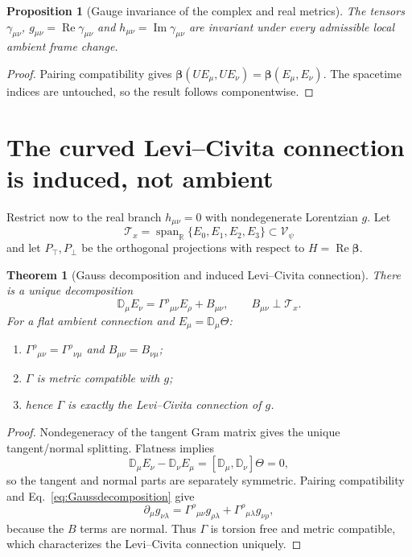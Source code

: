 \documentclass[11pt,a4paper]{article}
\newtheorem{theorem}[definition]{Theorem}
\newtheorem{proposition}[definition]{Proposition}
\theoremstyle{remark}
\newcommand{\V}{\mathscr V_\psi}
\newcommand{\Db}{\mathbb D}
\newcommand{\betaC}{\boldsymbol\beta}
\begin{document}
\begin{proposition}[Gauge invariance of the complex and real metrics]
The tensors $\gamma_{\mu\nu}$, $g_{\mu\nu}=\operatorname{Re}\gamma_{\mu\nu}$
and $h_{\mu\nu}=\operatorname{Im}\gamma_{\mu\nu}$ are invariant under every
admissible local ambient frame change.
\end{proposition}

\begin{proof}
Pairing compatibility gives
$\betaC(UE_\mu,UE_\nu)=\betaC(E_\mu,E_\nu)$.  The spacetime indices are
untouched, so the result follows componentwise.
\end{proof}

\section{The curved Levi--Civita connection is induced, not ambient}

Restrict now to the real branch $h_{\mu\nu}=0$ with nondegenerate Lorentzian
$g$.  Let
\[
 \mathscr T_x=\operatorname{span}_{\mathbb R}\{E_0,E_1,E_2,E_3\}
 \subset\V
\]
and let $P_\top,P_\perp$ be the orthogonal projections with respect to
$H=\operatorname{Re}\betaC$.

\begin{theorem}[Gauss decomposition and induced Levi--Civita connection]
There is a unique decomposition
\begin{equation}
 \boxed{
 \Db_\mu E_\nu
 =\Gamma^\rho{}_{\mu\nu}E_\rho+B_{\mu\nu},
 \qquad B_{\mu\nu}\perp\mathscr T_x.}
 \label{eq:Gaussdecomposition}
\end{equation}
For a flat ambient connection and $E_\mu=\Db_\mu\Theta$:
\begin{enumerate}
 \item $\Gamma^\rho{}_{\mu\nu}=\Gamma^\rho{}_{\nu\mu}$ and
       $B_{\mu\nu}=B_{\nu\mu}$;
 \item $\Gamma$ is metric compatible with $g$;
 \item hence $\Gamma$ is exactly the Levi--Civita connection of $g$.
\end{enumerate}
\end{theorem}

\begin{proof}
Nondegeneracy of the tangent Gram matrix gives the unique tangent/normal
splitting.  Flatness implies
\[
 \Db_\mu E_\nu-\Db_\nu E_\mu
 =[\Db_\mu,\Db_\nu]\Theta=0,
\]
so the tangent and normal parts are separately symmetric.  Pairing
compatibility and Eq.~\eqref{eq:Gaussdecomposition} give
\[
 \partial_\mu g_{\nu\lambda}
 =\Gamma^\rho{}_{\mu\nu}g_{\rho\lambda}
  +\Gamma^\rho{}_{\mu\lambda}g_{\nu\rho},
\]
because the $B$ terms are normal.  Thus $\Gamma$ is torsion free and metric
compatible, which characterizes the Levi--Civita connection uniquely.
\end{proof}
\end{document}
